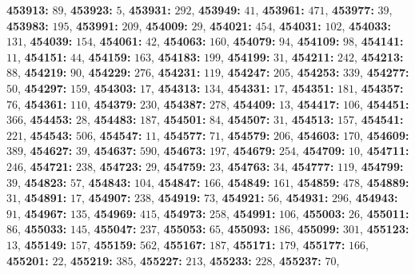 \textsf{\bfseries 453913:} $89$, \textsf{\bfseries 453923:} $5$, \textsf{\bfseries 453931:} $292$, \textsf{\bfseries 453949:} $41$, \textsf{\bfseries 453961:} $471$, \textsf{\bfseries 453977:} $39$, \textsf{\bfseries 453983:} $195$, \textsf{\bfseries 453991:} $209$, \textsf{\bfseries 454009:} $29$, \textsf{\bfseries 454021:} $454$, \textsf{\bfseries 454031:} $102$, \textsf{\bfseries 454033:} $131$, \textsf{\bfseries 454039:} $154$, \textsf{\bfseries 454061:} $42$, \textsf{\bfseries 454063:} $160$, \textsf{\bfseries 454079:} $94$, \textsf{\bfseries 454109:} $98$, \textsf{\bfseries 454141:} $11$, \textsf{\bfseries 454151:} $44$, \textsf{\bfseries 454159:} $163$, \textsf{\bfseries 454183:} $199$, \textsf{\bfseries 454199:} $31$, \textsf{\bfseries 454211:} $242$, \textsf{\bfseries 454213:} $88$, \textsf{\bfseries 454219:} $90$, \textsf{\bfseries 454229:} $276$, \textsf{\bfseries 454231:} $119$, \textsf{\bfseries 454247:} $205$, \textsf{\bfseries 454253:} $339$, \textsf{\bfseries 454277:} $50$, \textsf{\bfseries 454297:} $159$, \textsf{\bfseries 454303:} $17$, \textsf{\bfseries 454313:} $134$, \textsf{\bfseries 454331:} $17$, \textsf{\bfseries 454351:} $181$, \textsf{\bfseries 454357:} $76$, \textsf{\bfseries 454361:} $110$, \textsf{\bfseries 454379:} $230$, \textsf{\bfseries 454387:} $278$, \textsf{\bfseries 454409:} $13$, \textsf{\bfseries 454417:} $106$, \textsf{\bfseries 454451:} $366$, \textsf{\bfseries 454453:} $28$, \textsf{\bfseries 454483:} $187$, \textsf{\bfseries 454501:} $84$, \textsf{\bfseries 454507:} $31$, \textsf{\bfseries 454513:} $157$, \textsf{\bfseries 454541:} $221$, \textsf{\bfseries 454543:} $506$, \textsf{\bfseries 454547:} $11$, \textsf{\bfseries 454577:} $71$, \textsf{\bfseries 454579:} $206$, \textsf{\bfseries 454603:} $170$, \textsf{\bfseries 454609:} $389$, \textsf{\bfseries 454627:} $39$, \textsf{\bfseries 454637:} $590$, \textsf{\bfseries 454673:} $197$, \textsf{\bfseries 454679:} $254$, \textsf{\bfseries 454709:} $10$, \textsf{\bfseries 454711:} $246$, \textsf{\bfseries 454721:} $238$, \textsf{\bfseries 454723:} $29$, \textsf{\bfseries 454759:} $23$, \textsf{\bfseries 454763:} $34$, \textsf{\bfseries 454777:} $119$, \textsf{\bfseries 454799:} $39$, \textsf{\bfseries 454823:} $57$, \textsf{\bfseries 454843:} $104$, \textsf{\bfseries 454847:} $166$, \textsf{\bfseries 454849:} $161$, \textsf{\bfseries 454859:} $478$, \textsf{\bfseries 454889:} $31$, \textsf{\bfseries 454891:} $17$, \textsf{\bfseries 454907:} $238$, \textsf{\bfseries 454919:} $73$, \textsf{\bfseries 454921:} $56$, \textsf{\bfseries 454931:} $296$, \textsf{\bfseries 454943:} $91$, \textsf{\bfseries 454967:} $135$, \textsf{\bfseries 454969:} $415$, \textsf{\bfseries 454973:} $258$, \textsf{\bfseries 454991:} $106$, \textsf{\bfseries 455003:} $26$, \textsf{\bfseries 455011:} $86$, \textsf{\bfseries 455033:} $145$, \textsf{\bfseries 455047:} $237$, \textsf{\bfseries 455053:} $65$, \textsf{\bfseries 455093:} $186$, \textsf{\bfseries 455099:} $301$, \textsf{\bfseries 455123:} $13$, \textsf{\bfseries 455149:} $157$, \textsf{\bfseries 455159:} $562$, \textsf{\bfseries 455167:} $187$, \textsf{\bfseries 455171:} $179$, \textsf{\bfseries 455177:} $166$, \textsf{\bfseries 455201:} $22$, \textsf{\bfseries 455219:} $385$, \textsf{\bfseries 455227:} $213$, \textsf{\bfseries 455233:} $228$, \textsf{\bfseries 455237:} $70$, 
